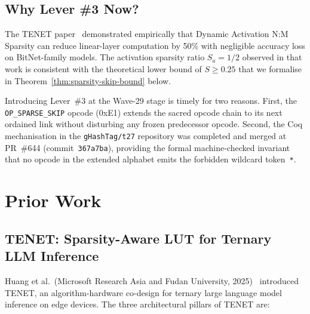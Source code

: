\subsection{Why Lever \#3 Now?}
\label{subsec:ch79-why-now}

The TENET paper~\cite{huang2025tenet} demonstrated empirically that
Dynamic Activation N:M Sparsity can reduce linear-layer computation
by 50\% with negligible accuracy loss on BitNet-family models.
The activation sparsity ratio $S_a = 1/2$ observed in that work
is consistent with the theoretical lower bound of $S \geq 0.25$
that we formalise in Theorem~\ref{thm:sparsity-skip-bound} below.

Introducing Lever~\#3 at the Wave-29 stage is timely for two reasons.
First, the \texttt{OP\_SPARSE\_SKIP} opcode (0xE1) extends the sacred
opcode chain to its next ordained link without disturbing any frozen
predecessor opcode.  Second, the Coq mechanisation in the
\texttt{gHashTag/t27} repository was completed and merged at
PR~\#644 (commit~\texttt{367a7ba}), providing the formal
machine-checked invariant that no opcode in the extended alphabet
emits the forbidden wildcard token~\texttt{*}.

\section{Prior Work}
\label{sec:ch79-prior-work}

\subsection{TENET: Sparsity-Aware LUT for Ternary LLM Inference}
\label{subsec:ch79-tenet}

Huang et al.\ (Microsoft Research Asia and Fudan University,
2025)~\cite{huang2025tenet} introduced TENET, an algorithm-hardware
co-design for ternary large language model inference on edge devices.
The three architectural pillars of TENET are:

